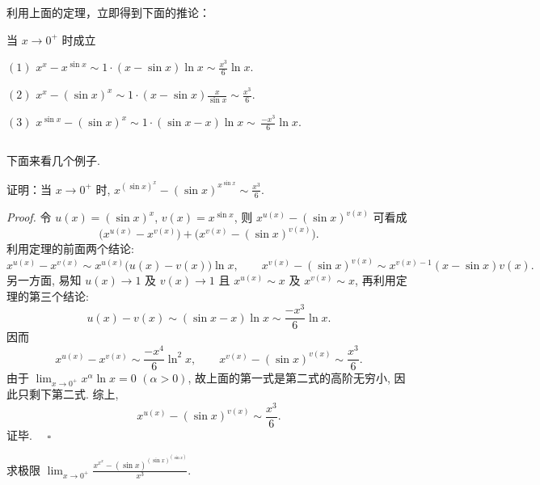 利用上面的定理，立即得到下面的推论：

\begin{corollary}{}
当 $x\to0^+$ 时成立

$(1)$ $x^{x}-x^{\sin x}\sim1\cdot(x-\sin x)\ln x\sim\frac{x^{3}}{6}\ln x.$

$(2)$ $x^{x}-(\sin x)^{x}\sim1\cdot(x-\sin x)\frac{x}{\sin x}\sim\frac{x^{3}}{6}.$

$(3)$ $x^{\sin x}-(\sin x)^{x}\sim1\cdot(\sin x-x)\ln x\sim\,\frac{-x^{3}}{6}\ln x.$
\end{corollary}

$$~$$ 

下面来看几个例子.

\begin{example}{}
证明：当 $x\to0^+$ 时, $x^{(\sin x)^{x}}-(\sin x)^{x^{\sin x}}\sim\frac{x^{3}}{6}.$ 
\end{example}
\textsl{Proof.} 令 $u(x)=(\sin x)^{x}$, $v(x)=x^{\sin x}$, 则 $x^{u(x)}-(\sin x)^{v(x)}$
可看成 $$\big(x^{u(x)}-x^{v(x)}\big)+\big(x^{v(x)}-(\sin x)^{v(x)}\big).~$$
利用定理的前面两个结论: 
\[
x^{u(x)}-x^{v(x)}\sim x^{u(x)}\big(u(x)-v(x)\big)\ln x,\qquad x^{v(x)}-(\sin x)^{v(x)}\sim x^{v(x)-1}(x-\sin x)v(x).~
\]
另一方面, 易知 $u(x)\to1$ 及 $v(x)\to1$ 且 $x^{u(x)}\sim x$ 及 $x^{v(x)}\sim x$, 再利用定理的第三个结论: 
\[
u(x)-v(x)\sim(\sin x-x)\ln x\sim\frac{-x^{3}}{6}\ln x.~
\]
因而 
\[
x^{u(x)}-x^{v(x)}\sim\frac{-x^{4}}{6}\ln^{2}x,\qquad x^{v(x)}-(\sin x)^{v(x)}\sim\frac{x^{3}}{6}.~
\]
由于 ${\displaystyle \lim_{x\to0^+}x^{\alpha}\ln x=0}$ $(\alpha>0)$,
故上面的第一式是第二式的高阶无穷小, 因此只剩下第二式. 综上, $$x^{u(x)}-(\sin x)^{v(x)}\sim\frac{x^{3}}{6}.~$$  证毕. $\quad\square$

\begin{exercise}{}
求极限 $\displaystyle\lim_{x\to 0^+}\frac{x^{x^x}-(\sin x)^{(\sin x)^{(\sin x)}}}{x^3}$.
\end{exercise}